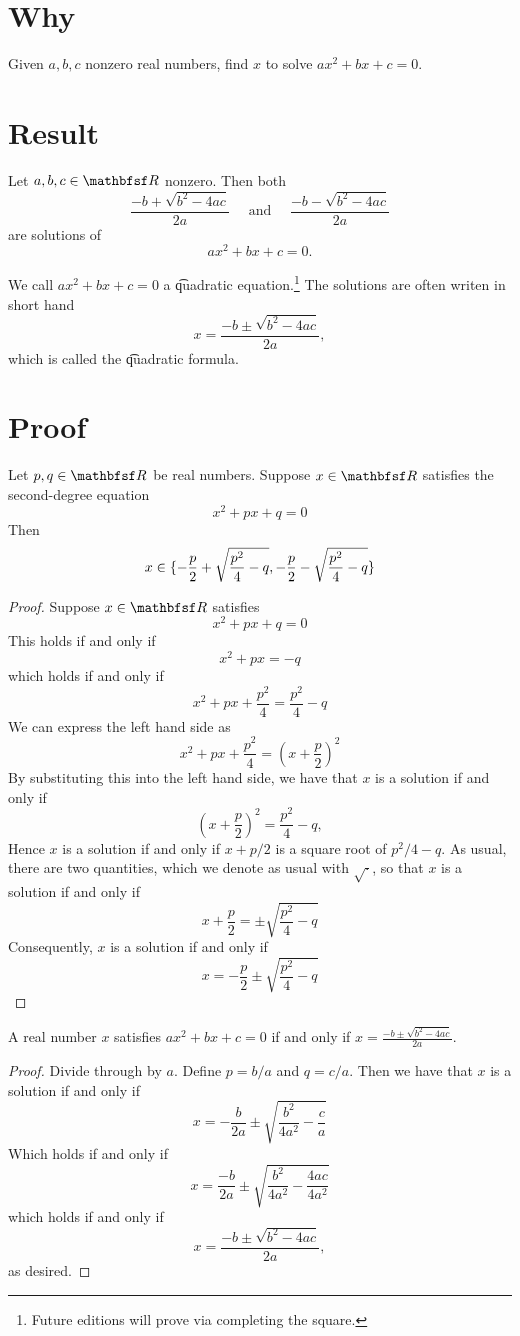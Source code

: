 
\section*{Why}

Given $a, b, c$ nonzero real numbers, find $x$ to solve $ax^2 + bx + c = 0$.

\section*{Result}

\begin{proposition}
Let $a, b, c \in \R $ nonzero.
Then both
\[
\frac{-b + \sqrt{b^2 - 4ac}}{2a}
\quad \text{ and } \quad
\frac{-b - \sqrt{b^2 - 4ac}}{2a}
\]
are solutions of
\[
ax^2 + bx + c = 0.
\]
\end{proposition}

We call $ax^2 + bx + c = 0$ a \t{quadratic equation}.\footnote{Future editions will prove via completing the square.}
The solutions are often writen in short hand
\[
x = \frac{-b \pm \sqrt{b^2 - 4ac}}{2a},
\]
which is called the \t{quadratic formula}.

\section*{Proof}

\begin{proposition}
Let $p, q \in \R $ be real numbers.
Suppose $x \in \R $ satisfies the second-degree equation
\[
x^2 + px + q = 0
\]
Then
\[
x \in \{-\frac{p}{2} + \sqrt{\frac{p^2}{4} - q}, -\frac{p}{2} - \sqrt{\frac{p^2}{4} - q}\}
\]
\end{proposition}

\begin{proof}Suppose $x \in \R $ satisfies
\[
x^2 + px + q = 0
\]
This holds if and only if
\[
x^2 + px = -q
\]
which holds if and only if
\[
x^2 + px + \frac{p^2}{4} = \frac{p^2}{4} - q
\]
We can express the left hand side as
\[
x^2 + px + \frac{p^2}{4} = \left(x + \frac{p}{2}\right)^2
\]
By substituting this into the left hand side, we have that $x$ is a solution if and only if
\[
\left(x + \frac{p}{2}\right)^2 = \frac{p^2}{4} - q,
\]
Hence $x$ is a solution if and only if $x + p/2$ is a square root of $p^2/4 - q$.
As usual, there are two quantities, which we denote as usual with $\sqrt{\cdot }$, so that $x$ is a solution if and only if
\[
x + \frac{p}{2} = \pm\sqrt{\frac{p^2}{4} - q}
\]
Consequently, $x$ is a solution if and only if
\[
x = -\frac{p}{2} \pm \sqrt{\frac{p^2}{4} - q}
\]\end{proof}
\begin{corollary}
A real number $x$ satisfies $ax^2 + bx + c = 0$ if and only if $x = \frac{-b \pm \sqrt{b^2-4ac}}{2a}$.
\end{corollary}

\begin{proof}Divide through by $a$.
Define $p = b/a$ and $q = c/a$.
Then we have that $x$ is a solution if and only if
\[
x = -\frac{b}{2a} \pm \sqrt{\frac{b^2}{4a^2} - \frac{c}{a}}
\]
Which holds if and only if
\[
x = \frac{-b}{2a} \pm \sqrt{\frac{b^2}{4a^2} - \frac{4ac}{4a^2}}
\]
which holds if and only if
\[
x = \frac{-b \pm \sqrt{b^2 - 4ac}}{2a},
\]
as desired.\end{proof}